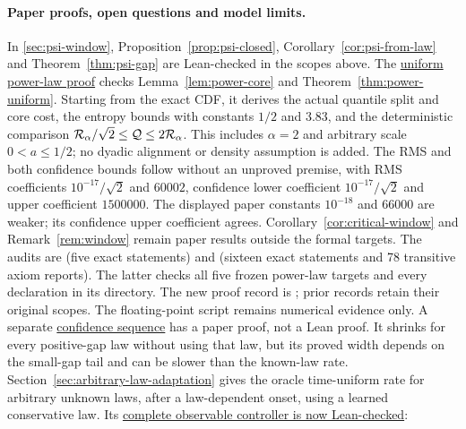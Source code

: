 \paragraph{Paper proofs, open questions and model limits.}
In \cref{sec:psi-window}, Proposition~\ref{prop:psi-closed},
Corollary~\ref{cor:psi-from-law} and Theorem~\ref{thm:psi-gap} are
Lean-checked in the scopes above. The
\href{https://github.com/davidiach/adaptive-threshold-estimation/blob/6965262b95490eeabf5d5158ad55e0393027f28c/lean/ThresholdHC/PowerWindow/Full.lean}{uniform power-law proof}
checks Lemma~\ref{lem:power-core} and Theorem~\ref{thm:power-uniform}.
Starting from the exact CDF, it derives the actual quantile split and core
cost, the entropy bounds with constants $1/2$ and $3.83$, and the
deterministic comparison $\mathcal R_\alpha/\sqrt2\le\mathcal Q\le2\mathcal R_\alpha$.
This includes $\alpha=2$ and arbitrary scale $0<a\le1/2$; no dyadic
alignment or density assumption is added. The RMS and both confidence
bounds follow without an unproved premise, with RMS coefficients
$10^{-17}/\sqrt2$ and $60002$, confidence lower coefficient
$10^{-17}/\sqrt2$ and upper coefficient $1500000$. The displayed paper
constants $10^{-18}$ and $66000$ are weaker; its confidence upper
coefficient agrees. Corollary~\ref{cor:critical-window} and
Remark~\ref{rem:window} remain paper results outside the formal targets.
The audits are  (five exact statements)
and  (sixteen exact statements and
78 transitive axiom reports). The latter checks all five frozen power-law
targets and every declaration in its directory. The new proof record is
; prior records retain their
original scopes.
The floating-point script
 remains numerical evidence only.
A separate \href{https://github.com/davidiach/adaptive-threshold-estimation/blob/a3b00cd8962060ca13768e5d3567168105e7ccfd/docs/UNKNOWN_LAW_CONFIDENCE.md}{confidence sequence}
has a paper proof, not a Lean proof. It shrinks for every positive-gap law
without using that law, but its proved width depends on the small-gap tail
and can be slower than the known-law rate. Section~\ref{sec:arbitrary-law-adaptation}
gives the oracle time-uniform rate for arbitrary unknown laws, after a
law-dependent onset, using a learned conservative law. Its
\href{https://github.com/davidiach/adaptive-threshold-estimation/blob/3f07e30a9a74a3b2b28c24ff5d017d3d60e093b1/lean/ThresholdHC/ArbitraryLawController/Full.lean}{complete observable controller is now Lean-checked}:
